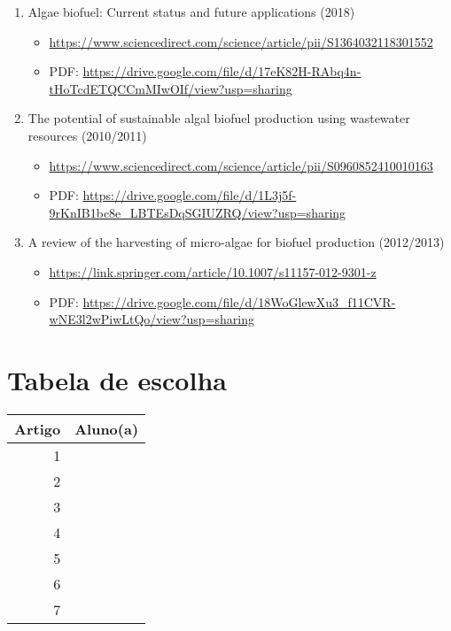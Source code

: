 \documentclass[11pt]{article}
\begin{document}
\begin{enumerate}
  \item Algae biofuel: Current status and future applications (2018)
        \begin{itemize}
          \item \url{https://www.sciencedirect.com/science/article/pii/S1364032118301552}
          \item PDF: \url{https://drive.google.com/file/d/17eK82H-RAbq4n-tHoTcdETQCCmMIwOIf/view?usp=sharing}
        \end{itemize}
  \item The potential of sustainable algal biofuel production using wastewater resources (2010/2011)
        \begin{itemize}
          \item \url{https://www.sciencedirect.com/science/article/pii/S0960852410010163}
          \item PDF: \url{https://drive.google.com/file/d/1L3j5f-9rKnIB1bc8e\_LBTEsDqSGIUZRQ/view?usp=sharing}
        \end{itemize}
  \item A review of the harvesting of micro-algae for biofuel production (2012/2013)
        \begin{itemize}
          \item \url{https://link.springer.com/article/10.1007/s11157-012-9301-z}
          \item PDF: \url{https://drive.google.com/file/d/18WoGlewXu3\_f11CVR-wNE3l2wPiwLtQo/view?usp=sharing}
        \end{itemize}
\end{enumerate}

\section{Tabela de escolha}
\label{sec:orge5bdf52}
\begin{center}
  \begin{tabular}{rl}
    \hline
    Artigo & Aluno(a)\\
    \hline
    1 & \\
    2 & \\
    3 & \\
    4 & \\
    5 & \\
    6 & \\
    7 & \\
    \hline
  \end{tabular}
\end{center}
\end{document}

